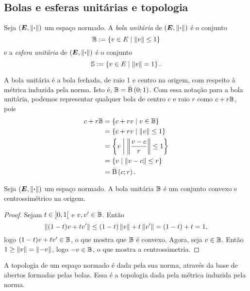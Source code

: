 \subsection{Bolas e esferas unitárias e topologia}

\begin{definition}
Seja $(\bm E,\left\Vert{\bm{\cdot}}\right\Vert)$ um espaço normado. A \emph{bola unitária} de $(\bm E,\left\Vert{\bm{\cdot}}\right\Vert)$ é o conjunto
	\begin{equation*}
	\mathbb{B} := \left\{ v \in E \;\middle\vert\; \left\Vert{v}\right\Vert \leq 1 \right\}
	\end{equation*}
e a \emph{esfera unitária} de $(\bm E,\left\Vert{\bm{\cdot}}\right\Vert)$ é o conjunto
	\begin{equation*}
	\mathbb{S} := \left\{ v \in E \;\middle\vert\; \left\Vert{v}\right\Vert = 1 \right\}.
	\end{equation*}
\end{definition}

A bola unitária é a bola fechada, de raio 1 e centro na origem, com respeito à métrica induzida pela norma. Isto é, $\mathbb{B} = \bar{\mathrm{B}}\left(0; 1\right)$. Com essa notação para a bola unitária, podemos representar qualquer bola de centro $c$ e raio $r$ como $c+r\mathbb{B}$, pois
	\begin{align*}
	c+r\mathbb{B} &= \left\{ c+rv \;\middle\vert\; v \in \mathbb{B} \right\} \\
		&= \left\{ c+rv \;\middle\vert\; \left\Vert{v}\right\Vert \leq 1 \right\} \\
		&= \left\{ v \;\middle\vert\; \left\Vert{\frac{v-c}{r}}\right\Vert \leq 1 \right\} \\
		&= \left\{ v \;\middle\vert\; \left\Vert{v-c}\right\Vert \leq r \right\} \\
		&= \bar{\mathrm{B}}\left(c; r\right).
	\end{align*}

\begin{proposition}
Seja $(\bm E,\left\Vert{\bm{\cdot}}\right\Vert)$ um espaço normado. A bola unitária $\mathbb{B}$ é um conjunto convexo e centrossimétrico na origem.
\end{proposition}
\begin{proof}
Sejam $t \in \left]0,\allowbreak 1\right[$ e $v,v' \in \mathbb{B}$. Então
	\begin{equation*}
	\left\Vert{(1-t)v+tv'}\right\Vert \leq (1-t)\left\Vert{v}\right\Vert+t\left\Vert{v'}\right\Vert =(1-t)+t=1,
	\end{equation*}
logo $(1-t)v+tv' \in \mathbb{B}$, o que mostra que $\mathbb{B}$ é convexo. Agora, seja $v \in \mathbb{B}$. Então $1 \geq \left\Vert{v}\right\Vert = \left\Vert{-v}\right\Vert$, logo $-v \in \mathbb{B}$, o que mostra a centrossimetria.
\end{proof}

A topologia de um espaço normado é dada pela sua norma, através da base de abertos formadas pelas bolas. Essa é a topologia dada pela métrica induzida pela norma.

